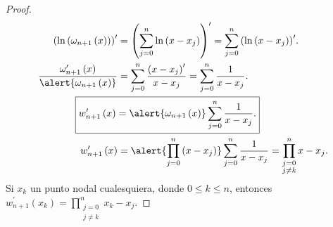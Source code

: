 \begin{frame}
\begin{proof}
		\begin{align*}
			{\left(
				\ln
				\left(
					\omega_{n+1}
					\left(x\right)
					\right)
			\right)}^{\prime} & =
			{\left(
			\sum\limits_{j=0}^{n}
			\ln
			\left(
				x-x_{j}
				\right)
			\right)}^{\prime}=
			\sum\limits_{j=0}^{n}
			{\left(
			\ln
			\left(
				x-x_{j}
				\right)
			\right)}^{\prime}.
			\\
			\dfrac{
				\omega^{\prime}_{n+1}\left(x\right)
			}{
				\alert{
					\omega_{n+1}\left(x\right)
				}
			}                 & =
			\sum\limits_{j=0}^{n}
			\dfrac{{\left(x-x_{j}\right)}^{\prime}}{x-x_{j}}=
			\sum\limits_{j=0}^{n}
			\dfrac{1}{x-x_{j}}.
			\\
			\Aboxed{
			w^{\prime}_{n+1}
			\left(x\right)    & =
			\alert{
				\omega_{n+1}
				\left(x\right)
			}
			\sum\limits_{j=0}^{n}
			\dfrac{1}{x-x_{j}}.
			}
			\\
			w^{\prime}_{n+1}
			\left(x\right)
			                  & =
			\alert{
				\prod\limits_{j=0}^{n}
				\left(
				x-x_{j}
				\right)
			}
			\sum\limits_{j=0}^{n}
			\dfrac{1}{x-x_{j}}=
			\prod\limits_{\substack{j=0 \\j\neq k}}^{n}
			x-x_{j}.
		\end{align*}
		Si $x_{k}$ un punto nodal cualesquiera, donde $0\leq k\leq n$,
		entonces
		\begin{math}
			w^{\prime}_{n+1}
			\left(x_{k}\right)=
			\prod\limits_{\substack{j=0 \\j\neq k}}^{n}
			x_{k}-x_{j}
		\end{math}.
	\end{proof}
\end{frame}


